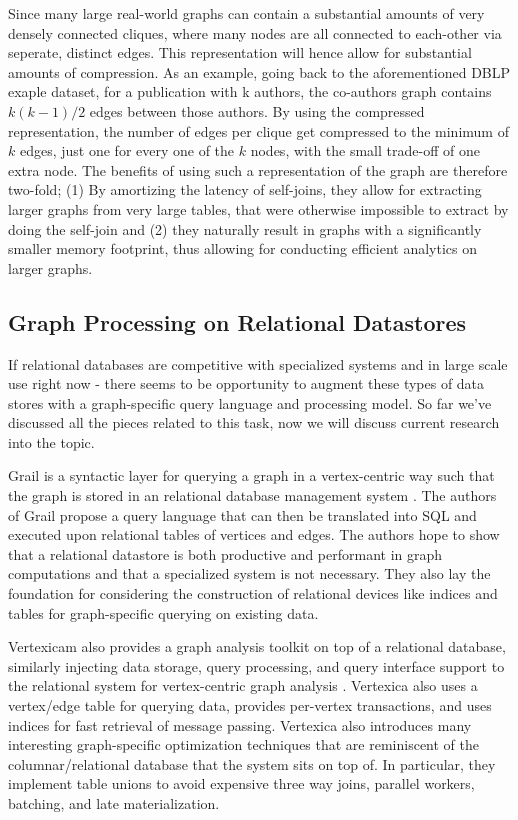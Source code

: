 \documentclass[11pt,letterpaper]{article}
\begin{document}
Since many large real-world graphs can contain a substantial amounts of very densely connected cliques, where many nodes are all connected to each-other via seperate, distinct edges. This representation will hence allow for substantial amounts of compression. As an example, going back to the aforementioned DBLP exaple dataset, for a publication with k authors, the co-authors graph contains $k(k-1)/2$ edges between those authors. By using the compressed representation, the number of edges per clique get compressed to the minimum of $k$ edges, just one for every one of the $k$ nodes, with the small trade-off of one extra node. The benefits of using such a representation of the graph are therefore two-fold; (1) By amortizing the latency of  self-joins, they allow for extracting larger graphs from very large tables, that were otherwise impossible to extract by doing the self-join and (2) they naturally result in graphs with a significantly smaller memory footprint, thus allowing for conducting efficient analytics on larger graphs.


\subsection*{Graph Processing on Relational Datastores}

If relational databases are competitive with specialized systems and in large scale use right now - there seems to be opportunity to augment these types of data stores with a graph-specific query language and processing model. So far we've discussed all the pieces related to this task, now we will discuss current research into the topic.

Grail \cite{fan_case_2015} is a syntactic layer for querying a graph in a vertex-centric way such that the graph is stored in an relational database management system
\cite{fan_case_2015}. The authors of Grail propose a query language that can then be translated into SQL and executed upon relational tables of vertices and edges. The authors hope to show that a relational datastore is both productive and performant in graph computations and that a specialized system is not necessary. They also lay the foundation for considering the construction of relational devices like indices and tables for graph-specific querying on existing data.

Vertexicam \cite{jindal_vertexica:_2014} also provides a graph analysis toolkit on top of a relational database, similarly injecting data storage, query processing, and query interface support to the relational system for vertex-centric graph analysis \cite{jindal_vertexica:_2014}. Vertexica also uses a vertex/edge table for querying data, provides per-vertex transactions, and uses indices for fast retrieval of message passing. Vertexica also introduces many interesting graph-specific optimization techniques that are reminiscent of the columnar/relational database that the system sits on top of. In particular, they implement table unions to avoid expensive three way joins, parallel workers, batching, and late materialization.
\end{document}
